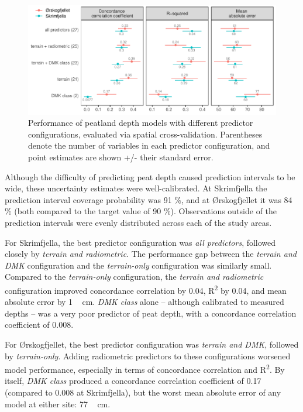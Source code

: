 \documentclass[soil, manuscript]{copernicus}
\begin{document}
\begin{figure}
\centering
\includegraphics{figures/modelmetrics.pdf}
\caption{\label{fig:modelMetrics}Performance of peatland depth models with different predictor configurations, evaluated via spatial cross-validation. Parentheses denote the number of variables in each predictor configuration, and point estimates are shown +/- their standard error.}
\end{figure}

Although the difficulty of predicting peat depth caused prediction intervals to be wide, these uncertainty estimates were well-calibrated.
At Skrimfjella the prediction interval coverage probability was 91 \%, and at Ørskogfjellet it was 84 \% (both compared to the target value of 90 \%).
Observations outside of the prediction intervals were evenly distributed across each of the study areas.

For Skrimfjella, the best predictor configuration was \emph{all predictors}, followed closely by \emph{terrain and radiometric}.
The performance gap between the \emph{terrain and DMK} configuration and the \emph{terrain-only} configuration was similarly small.
Compared to the \emph{terrain-only} configuration, the \emph{terrain and radiometric} configuration improved concordance correlation by 0.04, R\textsuperscript{2} by 0.04, and mean absolute error by \unit{1\,cm}.
\emph{DMK class} alone -- although calibrated to measured depths -- was a very poor predictor of peat depth, with a concordance correlation coefficient of 0.008.

For Ørskogfjellet, the best predictor configuration was \emph{terrain and DMK}, followed by \emph{terrain-only}.
Adding radiometric predictors to these configurations worsened model performance, especially in terms of concordance correlation and R\textsuperscript{2}.
By itself, \emph{DMK class} produced a concordance correlation coefficient of 0.17 (compared to 0.008 at Skrimfjella), but the worst mean absolute error of any model at either site: \unit{77\,cm}.
\end{document}
